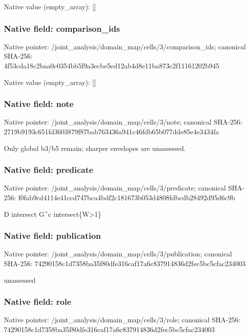 \documentclass[10pt,a4paper]{article}
\begin{document}
Native value (empty\_\allowbreak{}array): []

\subsubsection{Native field: comparison\_\allowbreak{}ids}
Native pointer: /joint\_\allowbreak{}analysis/domain\_\allowbreak{}map/cells/3/comparison\_\allowbreak{}ids; canonical SHA-256: 4f53cda18c2baa0c0354bb5f9a3ecbe5ed12ab4d8e11ba873c2f11161202b945

Native value (empty\_\allowbreak{}array): []

\subsubsection{Native field: note}
Native pointer: /joint\_\allowbreak{}analysis/domain\_\allowbreak{}map/cells/3/note; canonical SHA-256: 2719b9193c651fd3603879f87bab763436a941c46fdb65b077dde85e4e3434fa

\begingroup\raggedright\sloppy Only global b3/\allowbreak{}b5 remain;\allowbreak{} sharper envelopes are unassessed.\par\endgroup

\subsubsection{Native field: predicate}
Native pointer: /joint\_\allowbreak{}analysis/domain\_\allowbreak{}map/cells/3/predicate; canonical SHA-256: f0fab9cd4114e41ccd747bca4bdf2c181673b053d4808fdbcdb28492d95d6c9b

\begingroup\raggedright\sloppy D intersect G\textasciicircum{}c intersect\{W>1\}\par\endgroup

\subsubsection{Native field: publication}
Native pointer: /joint\_\allowbreak{}analysis/domain\_\allowbreak{}map/cells/3/publication; canonical SHA-256: 74290158c1d7358ba35f80dfe316caf17a6c837914836d2fec5bc5cfac234003

\begingroup\raggedright\sloppy unassessed\par\endgroup

\subsubsection{Native field: role}
Native pointer: /joint\_\allowbreak{}analysis/domain\_\allowbreak{}map/cells/3/role; canonical SHA-256: 74290158c1d7358ba35f80dfe316caf17a6c837914836d2fec5bc5cfac234003
\end{document}
